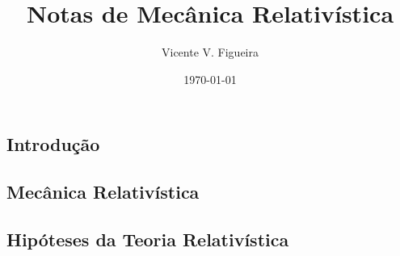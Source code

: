 \documentclass[twoside]{amsart}
\title{
Notas de Mecânica Relativística
}
\author{
  Vicente V. Figueira
       }
\date{\today}
\numberwithin{equation}{section}
\begin{document}
\maketitle

\tableofcontents


\begin{refsection}
\section{Introdução}

\printbibliography[heading=subbibliography]
\end{refsection}


\begin{refsection}
\section{Mecânica Relativística}

\subsection{Hipóteses da Teoria Relativística}

\printbibliography[heading=subbibliography]
\end{refsection}

\end{document}
